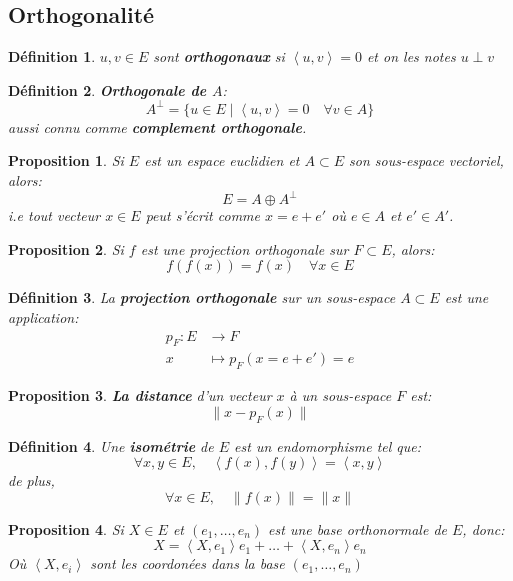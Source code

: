 \documentclass[a4paper]{article}
\newcommand{\scalair}[1]{\left\langle #1 \right\rangle}
\newtheorem{definition}{Définition}[section]
\newtheorem{prop}{Proposition}[section]
\begin{document}
\subsection{Orthogonalité}
\begin{definition}
    $u, v \in E$ sont \textbf{orthogonaux} si $\scalair{u, v} = 0$ et on les notes  $u \perp v$
\end{definition}
\begin{definition}
    \textbf{Orthogonale de $A$}:
    \[
        A^{\perp} = \{ u \in E \mid \scalair{u, v} = 0 \quad \forall v \in A \}
    \] 
    aussi connu comme  \textbf{complement orthogonale}.
\end{definition}
\begin{prop}
   Si $E$ est un espace euclidien et  $A \subset E$ son sous-espace vectoriel, alors:
   \[
       E = A \oplus A^{\perp}
   \] 
   i.e tout vecteur $x \in E$ peut s'écrit comme  $x = e + e'$ où  $e \in A$ et  $e' \in A'$.
\end{prop}
\begin{prop}
   Si $f$ est une projection orthogonale sur  $F \subset E$, alors:
   \[
   f(f(x)) = f(x) \quad \forall x \in E
   \] 
\end{prop}
\begin{definition}
    La \textbf{projection orthogonale} sur un sous-espace $A \subset E$ est une application:
    \begin{align*}
        p_F: E &\longrightarrow F \\
        x &\longmapsto p_F(x = e + e') = e
    \end{align*}
\end{definition}
\begin{prop}
    \textbf{La distance} d'un vecteur $x$ à un sous-espace  $F$ est:
    \[
    \|x - p_F(x)\|
    \] 
\end{prop}
\begin{definition}
    Une \textbf{isométrie} de $E$ est un endomorphisme tel que:
     \[
         \forall x, y \in E, \quad \scalair{f(x), f(y)} = \scalair{x, y}
    \]
    de plus,
    \[
    \forall x \in E, \quad \|f(x)\| = \|x\|
    \] 
\end{definition}
\begin{prop}
    Si $X \in E$ et $(e_1, \ldots, e_n)$  est une base orthonormale de $E$, donc:
     \[
         X =  \scalair{X, e_1}e_1 + \ldots + \scalair{X, e_n}e_n
    \] 
    Où $\scalair{X, e_i}$ sont les coordonées dans la base  $(e_1, \ldots, e_n)$
\end{prop}
\end{document}
